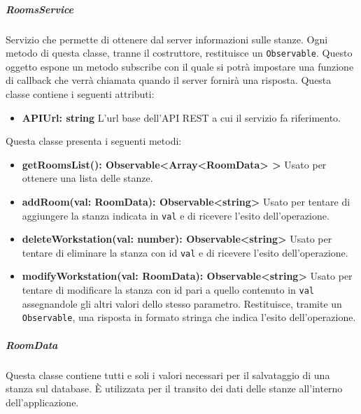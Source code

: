 \subparagraph{RoomsService}
Servizio che permette di ottenere dal server informazioni sulle stanze. Ogni metodo di questa classe, tranne il costruttore, restituisce un \texttt{Observable}. Questo oggetto espone un metodo subscribe con il quale si potrà impostare una funzione di callback che verrà chiamata quando il server fornirà una risposta. \newline
Questa classe contiene i seguenti attributi:
\begin{itemize}
	\item \textbf{APIUrl: string} \newline
	L'url base dell'API REST a cui il servizio fa riferimento.
\end{itemize}
Questa classe presenta i seguenti metodi:
\begin{itemize}
	\item \textbf{getRoomsList(): Observable<Array<RoomData> > 	} \newline
	Usato per ottenere una lista delle stanze.
	\item \textbf{addRoom(val: RoomData): Observable<string> 	} \newline
	Usato per tentare di aggiungere la stanza indicata in \texttt{val} e di ricevere l'esito dell'operazione.
	\item \textbf{deleteWorkstation(val: number): Observable<string> 	} \newline
	Usato per tentare di eliminare la stanza con id \texttt{val} e di ricevere l'esito dell'operazione.
	\item \textbf{modifyWorkstation(val: RoomData): Observable<string>} \newline
	Usato per tentare di modificare la stanza con id pari a quello contenuto in \texttt{val} assegnandole gli altri valori dello stesso parametro. Restituisce, tramite un \texttt{Observable}, una risposta in formato stringa che indica l'esito dell'operazione.
\end{itemize}
\subparagraph{RoomData}
Questa classe contiene tutti e soli i valori necessari per il salvataggio di una stanza sul database. È utilizzata per il transito dei dati delle stanze all'interno dell'applicazione. \newline

